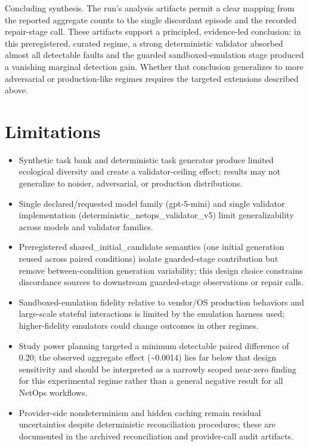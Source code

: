 \documentclass[conference]{IEEEtran}
\begin{document}
Concluding synthesis. The run's analysis artifacts permit a clear mapping from the reported aggregate counts to the single discordant episode and the recorded repair-stage call. These artifacts support a principled, evidence-led conclusion: in this preregistered, curated regime, a strong deterministic validator absorbed almost all detectable faults and the guarded sandboxed-emulation stage produced a vanishing marginal detection gain. Whether that conclusion generalizes to more adversarial or production-like regimes requires the targeted extensions described above.

\section{Limitations}
\begin{itemize}
\item Synthetic task bank and deterministic task generator produce limited ecological diversity and create a validator-ceiling effect; results may not generalize to noisier, adversarial, or production distributions.
\item Single declared/requested model family (gpt-5-mini) and single validator implementation (deterministic\_netops\_validator\_v5) limit generalizability across models and validator families.
\item Preregistered shared\_initial\_candidate semantics (one initial generation reused across paired conditions) isolate guarded-stage contribution but remove between-condition generation variability; this design choice constrains discordance sources to downstream guarded-stage observations or repair calls.
\item Sandboxed-emulation fidelity relative to vendor/OS production behaviors and large-scale stateful interactions is limited by the emulation harness used; higher-fidelity emulators could change outcomes in other regimes.
\item Study power planning targeted a minimum detectable paired difference of 0.20; the observed aggregate effect (\textasciitilde{}0.0014) lies far below that design sensitivity and should be interpreted as a narrowly scoped near-zero finding for this experimental regime rather than a general negative result for all NetOps workflows.
\item Provider-side nondeterminism and hidden caching remain residual uncertainties despite deterministic reconciliation procedures; these are documented in the archived reconciliation and provider-call audit artifacts.
\end{itemize}
\end{document}
